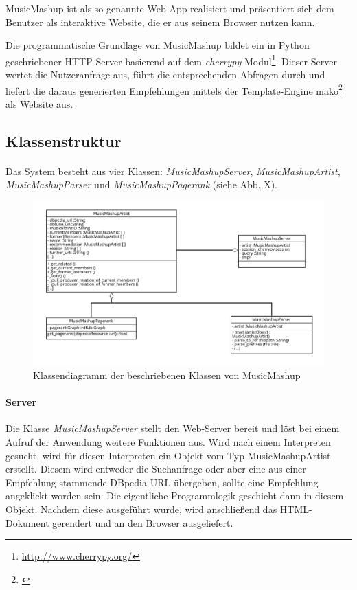 MusicMashup ist als so genannte Web-App realisiert und präsentiert sich dem Benutzer als interaktive Website, die er aus seinem Browser nutzen kann.

Die programmatische Grundlage von MusicMashup bildet ein in Python geschriebener 
HTTP-Server basierend auf dem \textit{cherrypy}-Modul\footnote{\url{http://www.cherrypy.org/}}. Dieser Server wertet die Nutzeranfrage aus, führt die entsprechenden Abfragen durch und liefert die daraus generierten Empfehlungen mittels der Template-Engine mako\footnote{\cite{http://www.makotemplates.org/}} als Website aus. 

\subsection{Klassenstruktur}


\paragraph{}Das System besteht aus vier Klassen: \textit{MusicMashupServer}, \textit{MusicMashupArtist}, \textit{MusicMashupParser} und \textit{MusicMashupPagerank} (siehe Abb. X).


\begin{figure}[ht!]
\centering
\includegraphics[width=137mm]{bilder/klassendiagramm.png}
\caption{Klassendiagramm der beschriebenen Klassen von MusicMashup \label{overflow}}
\end{figure}

\paragraph{Server} Die Klasse \textit{MusicMashupServer} stellt den Web-Server bereit und löst bei einem Aufruf der Anwendung weitere Funktionen aus. Wird nach einem Interpreten gesucht, wird für diesen Interpreten ein Objekt vom Typ MusicMashupArtist erstellt. Diesem wird entweder die Suchanfrage oder aber eine aus einer Empfehlung stammende DBpedia-URL übergeben, sollte eine Empfehlung angeklickt worden sein. Die eigentliche Programmlogik geschieht dann in diesem Objekt. Nachdem diese ausgeführt wurde, wird anschließend das HTML-Dokument gerendert und an den Browser ausgeliefert.


